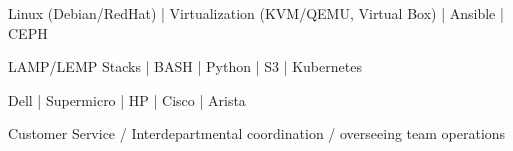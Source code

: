 
\begin{cvskills}

	\cvskill
	{}{Linux (Debian/RedHat) | Virtualization (KVM/QEMU, Virtual Box) | Ansible | CEPH}

	\cvskill
	{}{LAMP/LEMP Stacks | BASH | Python | S3 | Kubernetes}

	\cvskill
	{}{Dell | Supermicro | HP | Cisco | Arista }

	\cvskill
	{}{Customer Service / Interdepartmental coordination / overseeing team operations}

\end{cvskills}

